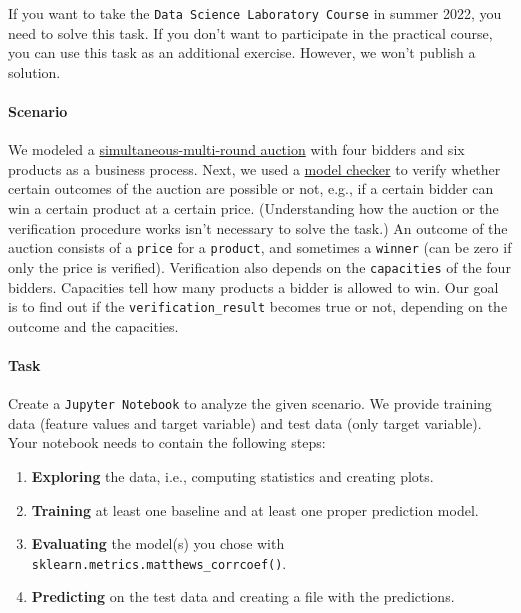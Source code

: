 \documentclass[12pt]{article}
\newcommand{\code}[1]{\textcolor{kitgreen}{\texttt{#1}}}
\begin{document}
\noindent
If you want to take the \code{Data Science Laboratory Course} in summer 2022, you need to solve this task.
If you don't want to participate in the practical course, you can use this task as an additional exercise.
However, we won't publish a solution.

\paragraph*{Scenario}

We modeled a \href{https://en.wikipedia.org/wiki/Spectrum_auction#Simultaneous_ascending_multiple-round_auction}{simultaneous-multi-round auction} with four bidders and six products as a business process.
Next, we used a \href{https://en.wikipedia.org/wiki/Model_checking}{model checker} to verify whether certain outcomes of the auction are possible or not, e.g., if a certain bidder can win a certain product at a certain price.
(Understanding how the auction or the verification procedure works isn't necessary to solve the task.)
An outcome of the auction consists of a \code{price} for a \code{product}, and sometimes a \code{winner} (can be zero if only the price is verified).
Verification also depends on the \code{capacities} of the four bidders.
Capacities tell how many products a bidder is allowed to win.
Our goal is to find out if the \code{verification\_result} becomes true or not, depending on the outcome and the capacities.

\paragraph{Task}

Create a \code{Jupyter Notebook} to analyze the given scenario.
We provide training data (feature values and target variable) and test data (only target variable).
Your notebook needs to contain the following steps:

\begin{enumerate}[left=0pt, topsep=0pt, noitemsep]
	\item \textbf{Exploring} the data, i.e., computing statistics and creating plots.
	\item \textbf{Training} at least one baseline and at least one proper prediction model.
	\item \textbf{Evaluating} the model(s) you chose with \code{sklearn.metrics.matthews\_corrcoef()}.
	\item \textbf{Predicting} on the test data and creating a file with the predictions.
\end{enumerate}
\end{document}
